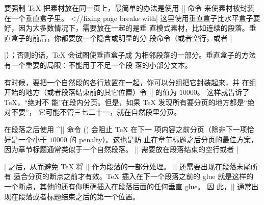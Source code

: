 要强制 \TeX{} 把素材放在同一页上，最简单的办法是使用 |\vbox| 命令
\ctsref{\vbox} 来使素材被封装在一个垂直盒子里。
^^|\vbox//fixing page breaks with|
这里使用垂直盒子比水平盒子要好，因为大多数情况下，需要放在一起的是垂
直模式素材，比如连续的段落。垂直盒子的前后，你都要放一个隐含或明显的分
段命令（或者空行，或者 |\par|）；否则的话，\TeX{} 会试图使垂直盒子成
为相邻段落的一部分。垂直盒子的方法有一个重要的局限：不能用于不足一个段
落的小部分文本。



有时候，要把一个自然段的各行放置在一起，你可以分组把它封装起来，并
在组开始的地方（或者段落结束前的其它位置）令 |\interlinepenalty|
\ctsref{\interlinepenalty} 的值为 $10000$。 这样就告诉了 \TeX{}，“绝对不
能”在段内分页。但是，如果 \TeX{} 发现所有要分页的地方都是“绝对不要”，
它可能不管三七二十一，就在自然段里分页。


在段落之后使用 ^|\nobreak| 命令 () 会阻止 \TeX{} 在下一
项内容之前分页（除非下一项恰好是一个小于 $10000$ 的 penalty）。这也是防
止在章节标题之后分页的最佳方案，因为章节标题通常类似于一个自然段落。
|\nobreak| 需要放在段落结束的空行或者 |\par| 之后，从而避免 \TeX{} 将
|\nobreak| 作为段落的一部分处理。 |\nobreak| 还需要出现在段落末尾所有
适合分页的断点之前才有效。\TeX{} 插入在下一个段落之前的 glue 就是这样的
一个断点，其他的还有你明确插入在段落后面的任何垂直 glue。 因
此，|\nobreak| 通常出现在段落或者标题结束之后的第一个位置。

